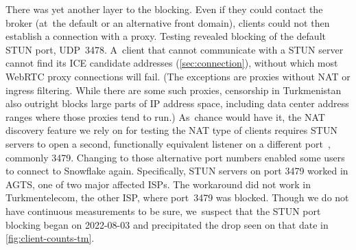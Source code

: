 \documentclass[letterpaper,twocolumn]{article}
\begin{document}
There was yet another layer to the blocking.
Even if they could contact the broker
(at~the default or an alternative front domain),
clients could not then establish a connection with a proxy.
Testing revealed blocking of the default STUN port, UDP~3478.
A~client that cannot communicate with a STUN server
cannot find its ICE candidate addresses (\autoref{sec:connection}),
without which most WebRTC proxy connections will fail.
(The exceptions are proxies without NAT or ingress filtering.
While there are some such proxies,
censorship in Turkmenistan also outright blocks
large parts of IP address space,
including data center address ranges where those proxies tend to run.)
As~chance would have it, the NAT discovery feature we rely on
for testing the NAT type of clients requires
STUN servers to open a second, functionally equivalent listener
on a different port~\cite[\S 6]{rfc5780}, commonly 3479.
Changing to those alternative port numbers
enabled some users to connect to Snowflake again.
Specifically, STUN servers on port 3479 worked in AGTS,
one of two major affected ISPs.
The workaround did not work in Turkmentelecom, the other ISP,
where port~3479 was blocked.
Though we do not have continuous measurements to be sure,
we~suspect that the STUN port blocking began on \mbox{2022-08-03}
and precipitated the drop seen on that date in \autoref{fig:client-counts-tm}.
\end{document}
